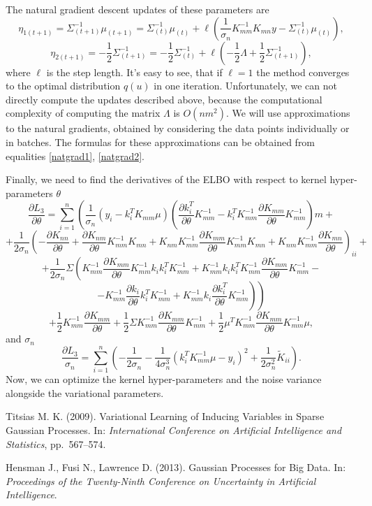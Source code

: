 \documentclass[12pt]{article}
\begin{document}
	The natural gradient descent updates of these parameters are
	$$\eta_{1(t+1)} = \Sigma_{(t+1)}^{-1} \mu_{(t+1)} = \Sigma_{(t)}^{-1} \mu_{(t)} + \ell \left(\frac 1 {\sigma_n} K_{mm}^{-1} K_{mn} y - \Sigma_{(t)}^{-1} \mu_{(t)} \right), $$
	$$\eta_{2 (t+1)} = -\frac 1 2 \Sigma_{(t+1)}^{-1} = -\frac 1 2 \Sigma_{(t)}^{-1}  + \ell \left( -\frac 1 2 \Lambda + \frac 1 2 \Sigma_{(t+1)}^{-1}\right),$$
	where $\ell$ is the step length. It's easy to see, that if $\ell = 1$ the method converges to the optimal distribution $q(u)$ in one iteration. Unfortunately, we can not directly compute the updates described above, because the computational complexity of computing the matrix $\Lambda$ is $O(n m^2)$. We will use approximations to the natural gradients, obtained by considering the data points individually or in batches. The formulas for these approximations can be obtained from equalities \ref{natgrad1}, \ref{natgrad2}.
	
	Finally, we need to find the derivatives of the ELBO with respect to kernel hyper-parameters $\theta$
	$$\frac{\partial L_3} {\partial \theta} = \sum_{i = 1}^n \left ( \frac 1 {\sigma_n} (y_i - k_i^T K_{mm} \mu) \left(\frac{\partial k_i^T}{\partial \theta} K_{mm}^{-1} - k_i^T K_{mm}^{-1} \frac{\partial K_{mm}}{\partial \theta} K_{mm}^{-1} \right)m + \right.$$
	$$\left. +\frac 1 {2 \sigma_n} \left (- \frac{\partial K_{nn}}{\partial \theta} +  \frac{\partial K_{nm}}{\partial \theta} K_{mm}^{-1} K_{mn} + K_{nm} K_{mm}^{-1} \frac{\partial K_{mm}}{\partial \theta} K_{mm}^{-1} K_{mn} + K_{nm} K_{mm}^{-1} \frac{\partial K_{mn}}{\partial \theta}\right)_ {ii} + \right.$$
	$$\left. +  \frac 1 {2 \sigma_n} \Sigma \left( K_{mm}^{-1} \frac{\partial K_{mm}}{\partial \theta} K_{mm}^{-1} k_i k_i^T K_{mm}^{-1}  + K_{mm}^{-1} k_i k_i^{T} K_{mm}^{-1} \frac{\partial K_{mm}}{\partial \theta} K_{mm}^{-1} - \right. \right.$$
	$$ \left. \left.-  K_{mm}^{-1} \frac{\partial k_{i}}{\partial \theta}k_i^T K_{mm}^{-1} + K_{mm}^{-1} k_i  \frac{\partial k_i^T}{\partial \theta} K_{mm}^{-1}\right)\right)$$
	$$ + \frac 1 2 K_{mm}^{-1} \frac{\partial K_{mm}}{\partial \theta} + \frac 1 2 \Sigma K_{mm}^{-1} \frac{\partial K_{mm}}{\partial \theta} K_{mm}^{-1} + \frac 1 2 \mu^T K_{mm}^{-1} \frac{\partial K_{mm}}{\partial \theta} K_{mm}^{-1}\mu,$$
	and $\sigma_n$
	$$\frac{\partial L_{3}}{\sigma_n} = \sum_{i = 1}^{n} \left(-\frac{1}{2\sigma_n} - \frac 1 {4 \sigma_n^3} (k_i^T K_{mm}^{-1} \mu - y_i)^2 + \frac 1 {2 \sigma_n^2} \tilde K_{ii}\right).$$
	Now, we can optimize the kernel hyper-parameters and the noise variance alongside the variational parameters. 
	
\pagebreak
\begin{thebibliography}{99}

Titsias M. K. (2009).  Variational Learning of Inducing Variables in Sparse Gaussian
Processes.  In: {\it International Conference on Artificial Intelligence and Statistics}, pp.~567–574.

Hensman J., Fusi N., Lawrence D. (2013).  Gaussian Processes for Big Data.  In: {\it Proceedings of the Twenty-Ninth Conference on Uncertainty in Artificial Intelligence}.

\end{thebibliography}	
\end{document}
